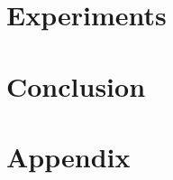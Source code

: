 \documentclass[12pt]{article}
\begin{document}
\section{Experiments}
    \label{sec:evaluation}
    


\section{Conclusion}
    \label{sec:conclusion}
    




\newpage
\appendix
\section{Appendix}


\newpage
{}
\tableofcontents
\end{document}
